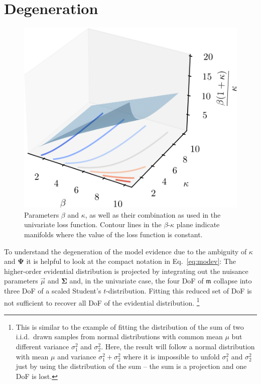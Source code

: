 \documentclass{article}
\begin{document}
\section{Degeneration}
\label{sec:appendix_degeneration}
\begin{figure}
    \centering
    \includegraphics[scale=.8]{degeneration.png}
    \caption{Parameters $\beta$ and $\kappa$, as well as their combination as used in the univariate loss function. Contour lines in the $\beta$-$\kappa$ plane indicate manifolds where the value of the loss function is constant.}
    \label{fig:degeneration}
\end{figure}
To understand the degeneration of the model evidence due to the ambiguity of $\kappa$ and $\bm{\Psi}$ it is helpful to look at the compact notation in Eq.~\eqref{eq:modev}:
The higher-order evidential distribution is projected by integrating out the nuisance parameters $\vec{\mu}$ and $\bm{\Sigma}$ and, in the univariate case, the four DoF of $\mathfrak{m}$ collapse into three DoF of a scaled Student's $t$-distribution.
Fitting this reduced set of DoF is not sufficient to recover all DoF of the evidential distribution.%
\footnote{This is similar to the example of fitting the distribution of the sum of two i.i.d.\ drawn samples from normal distributions with common mean $\mu$ but different variance $\sigma_1^2$ and $\sigma_2^2$. Here, the result will follow a normal distribution with mean $\mu$ and variance $\sigma_1^2 + \sigma_2^2$ where it is impossible to unfold $\sigma_1^2$ and $\sigma_2^2$ just by using the distribution of the sum -- the sum is a projection and one DoF is lost.}
\end{document}
